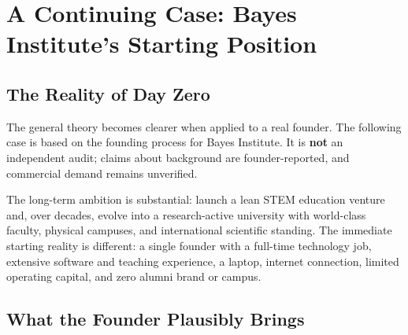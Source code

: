 \section{A Continuing Case: Bayes Institute's Starting Position}

\subsection{The Reality of Day Zero}

The general theory becomes clearer when applied to a real founder. The following case is based on the founding process for Bayes Institute. It is \textbf{not} an independent audit; claims about background are founder-reported, and commercial demand remains unverified.

The long-term ambition is substantial: launch a lean STEM education venture and, over decades, evolve into a research-active university with world-class faculty, physical campuses, and international scientific standing. The immediate starting reality is different: a single founder with a full-time technology job, extensive software and teaching experience, a laptop, internet connection, limited operating capital, and zero alumni brand or campus.

\subsection{What the Founder Plausibly Brings}

